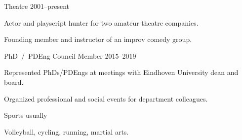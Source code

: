 
\begin{cventries}
    \cventry%
        {Theatre} %
        {} %
        {}%
        {2001--present} %
        {\begin{cvitems}
            \item {Actor and playscript hunter for two amateur theatre companies.}
            \item {Founding member and instructor of an improv comedy group.}
        \end{cvitems}}

    \cventry%
        {PhD~/~PDEng Council Member} %
        {} %
        {} %
        {2015--2019} %
        {\begin{cvitems}
            \item {Represented PhDs/PDEngs at meetings with Eindhoven University dean and board.}
            \item {Organized professional and social events for department colleagues.}
        \end{cvitems}}

    \cventry%
        {Sports} %
        {} %
        {} %
        {usually} %
        {\begin{cvitems}
            \item {Volleyball, cycling, running, martial arts.}
        \end{cvitems}}
\end{cventries}

